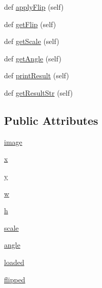 \begin{DoxyCompactItemize}
\item 
def \hyperlink{classsample_generator_1_1sample_1_1sample_a13629bd805c34f9847ded8720650d37b}{apply\+Flip} (self)
\item 
def \hyperlink{classsample_generator_1_1sample_1_1sample_ac19fa7a0cafb1b32d1aceb67684bd25d}{get\+Flip} (self)
\item 
def \hyperlink{classsample_generator_1_1sample_1_1sample_abad33069f3e1539735ea8ac428d1a510}{get\+Scale} (self)
\item 
def \hyperlink{classsample_generator_1_1sample_1_1sample_a1e181c79a730200bfda7152af9b7e913}{get\+Angle} (self)
\item 
def \hyperlink{classsample_generator_1_1sample_1_1sample_ad303cd515503d840a5bcb49115b3bced}{print\+Result} (self)
\item 
def \hyperlink{classsample_generator_1_1sample_1_1sample_a8bc9b0512da0a0056ecc6759ebcd8e97}{get\+Result\+Str} (self)
\end{DoxyCompactItemize}
\subsection*{Public Attributes}
\begin{DoxyCompactItemize}
\item 
\hyperlink{classsample_generator_1_1sample_1_1sample_a6ce5140cd9b1e8a992decaec244ffab3}{image}
\item 
\hyperlink{classsample_generator_1_1sample_1_1sample_adb77f64e0cd95e72a350bdbbc9721ea3}{x}
\item 
\hyperlink{classsample_generator_1_1sample_1_1sample_aafe18daa5e07bcd4c13a3c142d2a9ec6}{y}
\item 
\hyperlink{classsample_generator_1_1sample_1_1sample_a5df07f1716ac15a606bd2173e9a8c4ce}{w}
\item 
\hyperlink{classsample_generator_1_1sample_1_1sample_affc54a1c75e13feaa03da08c39c63d22}{h}
\item 
\hyperlink{classsample_generator_1_1sample_1_1sample_a30515bba1d64f66e13e5eb8cc7b4cae4}{scale}
\item 
\hyperlink{classsample_generator_1_1sample_1_1sample_ac472f4cf88aaab6e0d42f082a54d9d01}{angle}
\item 
\hyperlink{classsample_generator_1_1sample_1_1sample_aa0e2b87b21de450d7b58874866858580}{loaded}
\item 
\hyperlink{classsample_generator_1_1sample_1_1sample_a6a4f4a7b71afef026e82edb51a5bf340}{flipped}
\end{DoxyCompactItemize}


